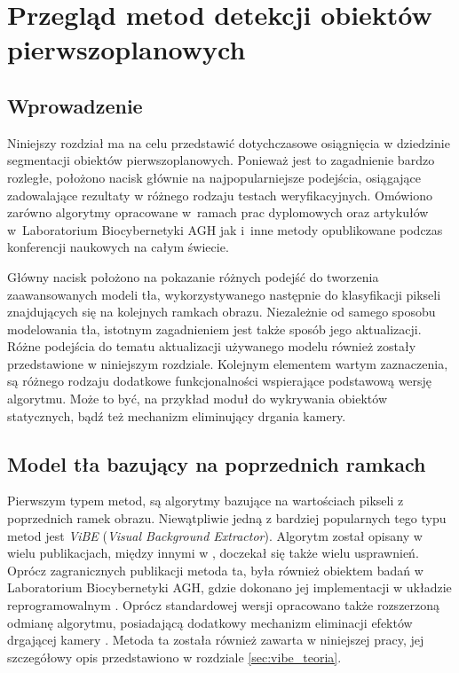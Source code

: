 \chapter{Przegląd metod detekcji obiektów pierwszoplanowych}
\label{cha:przeglad_metod}

\section{Wprowadzenie}
\label{sec:przeglad_wprowadzenie}

Niniejszy rozdział ma na celu przedstawić dotychczasowe osiągnięcia w dziedzinie segmentacji obiektów pierwszoplanowych. 
Ponieważ jest to zagadnienie bardzo rozległe, położono nacisk głównie na najpopularniejsze podejścia, osiągające zadowalające rezultaty w różnego rodzaju testach weryfikacyjnych. 
Omówiono zarówno algorytmy opracowane w~ramach prac dyplomowych oraz artykułów w~Laboratorium Biocybernetyki AGH jak i~inne metody opublikowane podczas konferencji naukowych na całym świecie. 

Główny nacisk położono na pokazanie różnych podejść do tworzenia zaawansowanych modeli tła, wykorzystywanego następnie do klasyfikacji pikseli znajdujących się na kolejnych ramkach obrazu. 
Niezależnie od samego sposobu modelowania tła, istotnym zagadnieniem jest także sposób jego aktualizacji. 
Różne podejścia do tematu aktualizacji używanego modelu również zostały przedstawione w niniejszym rozdziale. 
Kolejnym elementem wartym zaznaczenia, są różnego rodzaju dodatkowe funkcjonalności wspierające podstawową wersję algorytmu. 
Może to być, na przykład moduł do wykrywania obiektów statycznych, bądź też mechanizm eliminujący drgania kamery.


\section{Model tła bazujący na poprzednich ramkach}
\label{sec:model_poprzednie_ramki}

Pierwszym typem metod, są algorytmy bazujące na wartościach pikseli z poprzednich ramek obrazu. 
Niewątpliwie jedną z bardziej popularnych tego typu metod jest \textit{ViBE} (\textit{Visual Background Extractor}). 
Algorytm został opisany w wielu publikacjach, między innymi w \cite{barnich_11, droogenbroeck_12}, doczekał się także wielu usprawnień.
Oprócz zagranicznych publikacji metoda ta, była również obiektem badań w Laboratorium Biocybernetyki AGH, gdzie dokonano jej implementacji w układzie reprogramowalnym \cite{kryjak_13_vibe}. 
Oprócz standardowej wersji opracowano także rozszerzoną odmianę algorytmu, posiadającą dodatkowy mechanizm eliminacji efektów drgającej kamery \cite{kryjak_14_vibe}. 
Metoda ta została również zawarta w niniejszej pracy, jej szczegółowy opis przedstawiono w rozdziale \ref{sec:vibe_teoria}.

